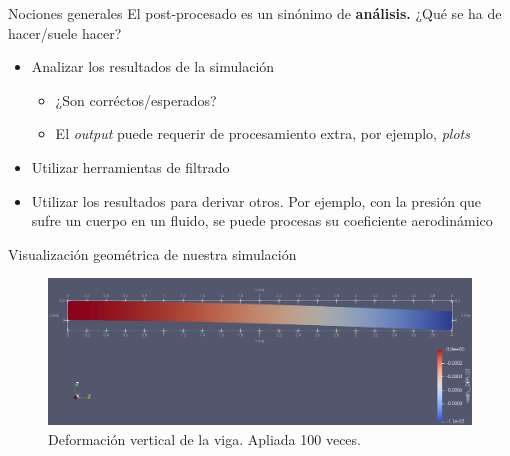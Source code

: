 \documentclass[12pt]{beamer}
\begin{document}
\begin{frame}{Nociones generales}
	El post-procesado es un sinónimo de \textbf{análisis.} ¿Qué se ha de hacer/suele hacer? 
	\begin{itemize}
		\item Analizar los resultados de la simulación
		\begin{itemize}
			\item ¿Son corréctos/esperados?
			\item El \textit{output} puede requerir de procesamiento extra, por ejemplo, \textit{plots}
		\end{itemize}
		\item Utilizar herramientas de filtrado
		\item Utilizar los resultados para derivar otros. Por ejemplo, con la presión que sufre un cuerpo en un fluido, se puede procesas su coeficiente aerodinámico
	\end{itemize}
\end{frame}

\begin{frame}{Visualización geométrica de nuestra simulación}
	\begin{figure}
		\centering
		\hspace*{-1em}\includegraphics[width=1.1\linewidth]{3dview}
		\caption{Deformación vertical de la viga. Apliada 100 veces.}
		\label{fig:3dview}
	\end{figure}
\end{frame}
\end{document}
